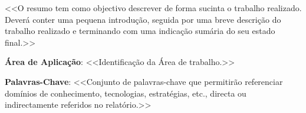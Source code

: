 \documentclass[a4paper,12pt]{scrreprt}
\begin{document}




\makecover





\renewenvironment{abstract}
 {\par\noindent\textbf{\Large\abstractname}\par\bigskip}
 {}

\begin{flushleft}
\begin{abstract}
    <<O resumo tem como objectivo descrever de forma sucinta o trabalho realizado. Deverá conter uma pequena introdução, seguida por uma breve descrição do trabalho realizado e terminando com uma indicação sumária do seu estado final.>>
    \par \textbf{Área de Aplicação}: <<Identificação da Área de trabalho.>>
    \par \textbf{Palavras-Chave}: <<Conjunto de palavras-chave que permitirão referenciar domínios de conhecimento, tecnologias, estratégias, etc., directa ou indirectamente referidos no relatório.>>
\end{abstract}
\end{flushleft}

\pagebreak



\renewcommand{\contentsname}{Índice}
\renewcommand{\listfigurename}{Índice de Figuras}
\renewcommand{\listtablename}{Índice de Tabelas}
\renewcommand{\lstlistlistingname}{Índice de \textit{Snippets}}
\end{document}
